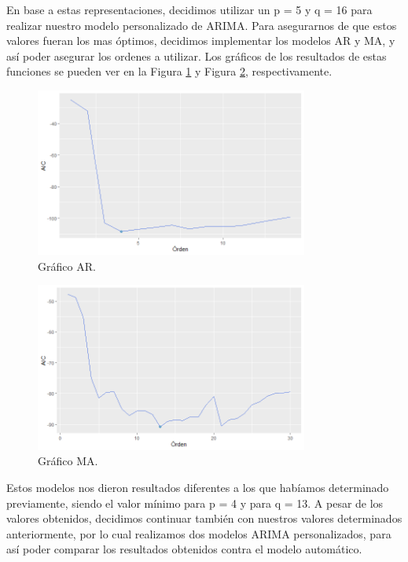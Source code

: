 \documentclass{article} %
\begin{document}
En base a estas representaciones, decidimos utilizar un p = 5 y q = 16 para realizar nuestro modelo personalizado de ARIMA. Para asegurarnos de que estos valores fueran los mas óptimos, decidimos implementar los modelos AR y MA, y así poder asegurar los ordenes a utilizar. Los gráficos de los resultados de estas funciones se pueden ver en la Figura \ref{fig:AR} y Figura \ref{fig:MA}, respectivamente.

\begin{figure}[H]
	\centering
	\includegraphics[width=0.8\textwidth]{images/4-10 AR}
	\caption{Gráfico AR.}
	\label{fig:AR}
\end{figure} 
\begin{figure}[H]
	\centering
	\includegraphics[width=0.8\textwidth]{images/4-11 MA}
	\caption{Gráfico MA.}
	\label{fig:MA}
\end{figure} 

Estos modelos nos dieron resultados diferentes a los que habíamos determinado previamente, siendo el valor mínimo para p = 4 y para q = 13. A pesar de los valores obtenidos, decidimos continuar también con nuestros valores determinados anteriormente, por lo cual realizamos dos modelos ARIMA personalizados, para así poder comparar los resultados obtenidos contra el modelo automático. 
\end{document}
